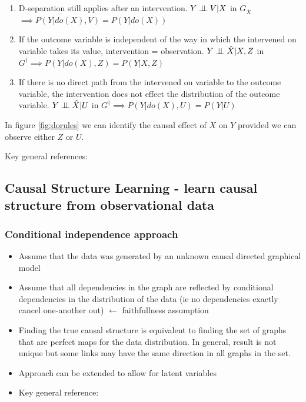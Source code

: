 \documentclass{article}
\begin{document}
\begin{enumerate}
\item D-separation still applies after an intervention. $Y \perp\!\!\!\perp V|X$ in $G_{\overline{X}}$ $\implies P(Y|do(X),V) = P(Y|do(X))$
\item If the outcome variable is independent of the way in which the intervened on variable takes its value, intervention = observation. $Y \perp\!\!\!\perp \hat{X}|X,Z$ in $G^{\dagger} \implies P(Y|do(X),Z) = P(Y|X,Z)$
\item If there is no direct path from the intervened on variable to the outcome variable, the intervention does not effect the distribution of the outcome variable. $Y \perp\!\!\!\perp \hat{X}|U$ in  $G^{\dagger} \implies P(Y|do(X),U) = P(Y|U)$
\end{enumerate}
In figure \ref{fig:dorules} we can identify the causal effect of $X$ on $Y$ provided we can observe either $Z$ or $U$.

Key general references: \cite{Pearl2000,Koller2009}

\subsection*{Causal Structure Learning - learn causal structure from observational data}
\subsubsection*{Conditional independence approach} 

\begin{itemize}
\item Assume that the data was generated by an unknown causal directed graphical model
\item Assume that all dependencies in the graph are reflected by conditional dependencies in the distribution of the data (ie no dependencies exactly cancel one-another out) $\leftarrow$ faithfullness assumption
\item Finding the true causal structure is equivalent to finding the set of graphs that are perfect maps for the data distribution. In general, result is not unique but some links may have the same direction in all graphs in the set.
\item Approach can be extended to allow for latent variables
\item Key general reference: \cite{Sprites}
\end{itemize}
\end{document}
